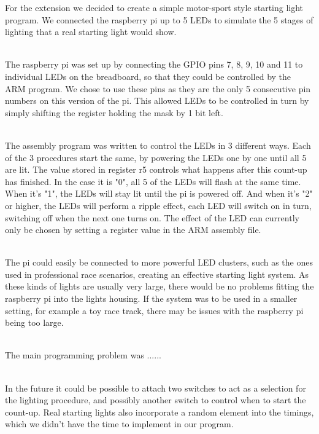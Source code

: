 For the extension we decided to create a simple motor-sport style starting light program. We connected the raspberry pi up to 5 LEDs to simulate the 5 stages of lighting that a real starting light would show. 

~\\

The raspberry pi was set up by connecting the GPIO pins 7, 8, 9, 10 and 11 to individual LEDs on the breadboard, so that they could be controlled by the ARM program. We chose to use these pins as they are the only 5 consecutive pin numbers on this version of the pi. This allowed LEDs to be controlled in turn by simply shifting the register holding the mask by 1 bit left. 

~\\

The assembly program was written to control the LEDs in 3 different ways. Each of the 3 procedures start the same, by powering the LEDs one by one until all 5 are lit. The value stored in register r5 controls what happens after this count-up has finished. In the case it is "0", all 5 of the LEDs will flash at the same time. When it's "1", the LEDs will stay lit until the pi is powered off. And when it's "2" or higher, the LEDs will perform a ripple effect, each LED will switch on in turn, switching off when the next one turns on. The effect of the LED can currently only be chosen by setting a register value in the ARM assembly file. 

~\\

The pi could easily be connected to more powerful LED clusters, such as the ones used in professional race scenarios, creating an effective starting light system. As these kinds of lights are usually very large, there would be no problems fitting the raspberry pi into the lights housing. If the system was to be used in a smaller setting, for example a toy race track, there may be issues with the raspberry pi being too large.

~\\

The main programming problem was ......

~\\

In the future it could be possible to attach two switches to act as a selection for the lighting procedure, and possibly another switch to control when to start the count-up. Real starting lights also incorporate a random element into the timings, which we didn't have the time to implement in our program.